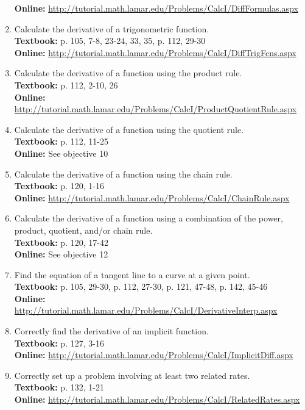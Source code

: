 \documentclass[12pt,landscape]{article}
\begin{document}
\begin{multicols}{2}
\begin{enumerate}
\textbf{Online:} \url{http://tutorial.math.lamar.edu/Problems/CalcI/DiffFormulas.aspx}
\item Calculate the derivative of a trigonometric function.\\
\textbf{Textbook:} p. 105, 7-8, 23-24, 33, 35, p. 112, 29-30\\
\textbf{Online:} \url{http://tutorial.math.lamar.edu/Problems/CalcI/DiffTrigFcns.aspx}
\item Calculate the derivative of a function using the product rule.\\ 
\textbf{Textbook:} p. 112, 2-10, 26\\
\textbf{Online:} \url{http://tutorial.math.lamar.edu/Problems/CalcI/ProductQuotientRule.aspx}
\item Calculate the derivative of a function using the quotient rule.\\
\textbf{Textbook:} p. 112, 11-25\\
\textbf{Online:} See objective 10
\item Calculate the derivative of a function using the chain rule.\\
\textbf{Textbook:} p. 120, 1-16\\
\textbf{Online:} \url{http://tutorial.math.lamar.edu/Problems/CalcI/ChainRule.aspx}
\item Calculate the derivative of a function using a combination of the power, product, quotient, and/or chain rule.\\
\textbf{Textbook:} p. 120, 17-42\\
\textbf{Online:} See objective 12
\item Find the equation of a tangent line to a curve at a given point.\\
\textbf{Textbook:} p. 105, 29-30, p. 112, 27-30, p. 121, 47-48, p. 142, 45-46\\
\textbf{Online:} \url{http://tutorial.math.lamar.edu/Problems/CalcI/DerivativeInterp.aspx}
\item Correctly find the derivative of an implicit function.\\
\textbf{Textbook:} p. 127, 3-16 \\
\textbf{Online:} \url{http://tutorial.math.lamar.edu/Problems/CalcI/ImplicitDiff.aspx}
\item Correctly set up a problem involving at least two related rates.\\
\textbf{Textbook:} p. 132, 1-21\\
\textbf{Online:} \url{http://tutorial.math.lamar.edu/Problems/CalcI/RelatedRates.aspx}

\end{enumerate}
\end{multicols}
\end{document}
